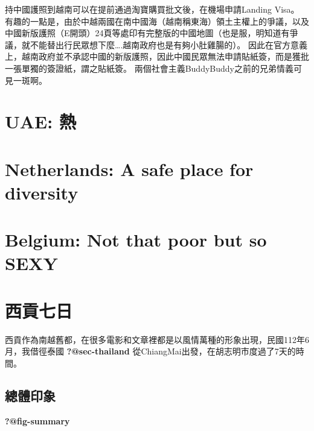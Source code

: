 \documentclass[
  a4paper,
]{ctexart}
\begin{document}
持中國護照到越南可以在提前通過淘寶購買批文後，在機場申請Landing Visa。
有趣的一點是，由於中越兩國在南中國海（越南稱東海）領土主權上的爭議，以及中國新版護照（E開頭）24頁等處印有完整版的中國地圖（也是服，明知道有爭議，就不能替出行民眾想下麼\ldots.越南政府也是有夠小肚雞腸的）。
因此在官方意義上，越南政府並不承認中國的新版護照，因此中國民眾無法申請貼紙簽，而是獲批一張單獨的簽證紙，謂之貼紙簽。
兩個社會主義BuddyBuddy之前的兄弟情義可見一斑啊。


\hypertarget{uae-ux71b1}{%
\chapter{UAE: 熱}\label{uae-ux71b1}}


\hypertarget{netherlands-a-safe-place-for-diversity}{%
\chapter{Netherlands: A safe place for
diversity}\label{netherlands-a-safe-place-for-diversity}}


\hypertarget{belgium-not-that-poor-but-so-sexy}{%
\chapter{Belgium: Not that poor but so
SEXY}\label{belgium-not-that-poor-but-so-sexy}}


\hypertarget{ux897fux8ca2ux4e03ux65e5}{%
\chapter{西貢七日}\label{ux897fux8ca2ux4e03ux65e5}}

西貢作為南越舊都，在很多電影和文章裡都是以風情萬種的形象出現，民國112年6月，我借徑泰國
\textbf{?@sec-thailand} 從ChiangMai出發，在胡志明市度過了7天的時間。

\hypertarget{ux7e3dux9ad4ux5370ux8c61-1}{%
\section{總體印象}\label{ux7e3dux9ad4ux5370ux8c61-1}}

\textbf{?@fig-summary}
\end{document}
